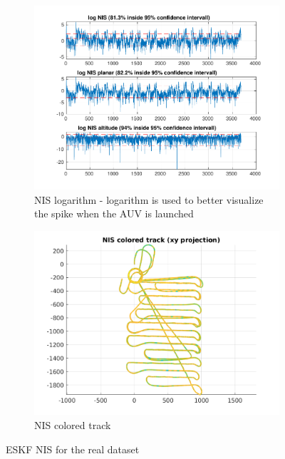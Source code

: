 \begin{figure}[H]
        \centering
        \begin{subfigure}[b]{0.50\textwidth}
                \includegraphics[width=\textwidth]{plots/a2-real-nis}
                \caption{ NIS logarithm - logarithm is used to better visualize the spike when the AUV is launched}
                \label{fig:eskf-real-nis-basic}
        \end{subfigure}%
        \hfill
        \begin{subfigure}[b]{0.50\textwidth}
                \includegraphics[width=\textwidth]{plots/a2-real-nis-colored-track}
                \caption{NIS colored track}
                \label{fig:eskf-real-nis-coloredtrack}
        \end{subfigure}
        \caption{ESKF NIS for the real dataset}
\end{figure}
